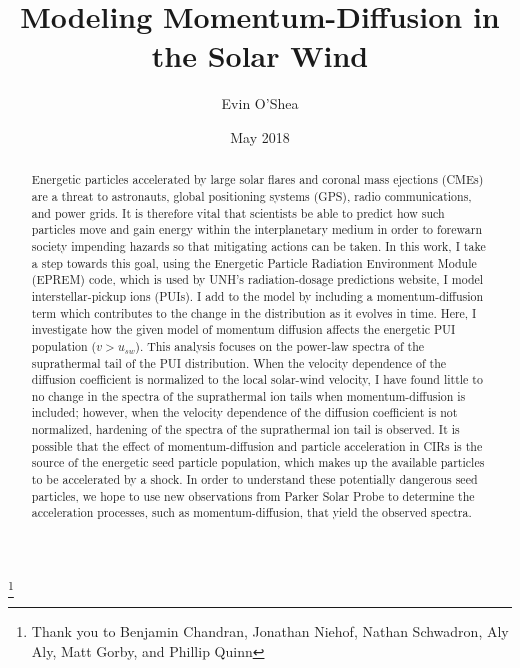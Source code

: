 \documentclass[%
 reprint,
 amsmath,amssymb,
 aps,
]{revtex4-1}
\begin{document}
\title{Modeling Momentum-Diffusion in the Solar Wind}
\thanks{Thank you to Benjamin Chandran, Jonathan Niehof, Nathan Schwadron, Aly Aly, Matt Gorby, and Phillip Quinn}

\author{Evin O'Shea}
\date{May 2018}



\begin{abstract}
Energetic particles accelerated by large solar flares and coronal mass ejections (CMEs) are a threat to astronauts, global positioning systems (GPS), radio communications, and power grids. It is therefore vital that scientists be able to predict how such particles move and gain energy within the interplanetary medium in order to forewarn society impending hazards so that mitigating actions can be taken. In this work, I take a step towards this goal, using the Energetic Particle Radiation Environment Module (EPREM) code, which is used by UNH's radiation-dosage predictions website, I model interstellar-pickup ions (PUIs). I add to the model by including a momentum-diffusion term which contributes to the change in the distribution as it evolves in time. Here, I investigate how the given model of momentum diffusion affects the energetic PUI population ($v>u_{sw}$). This analysis focuses on the power-law spectra of the suprathermal tail of the PUI distribution. When the velocity dependence of the diffusion coefficient is normalized to the local solar-wind velocity, I have found little to no change in the spectra of the suprathermal ion tails when momentum-diffusion is included; however, when the velocity dependence of the diffusion coefficient is not normalized, hardening of the spectra of the suprathermal ion tail is observed. It is possible that the effect of momentum-diffusion and particle acceleration in CIRs is the source of the energetic seed particle population, which makes up the available particles to be accelerated by a shock. In order to understand these potentially dangerous seed particles, we hope to use new observations from Parker Solar Probe to determine the acceleration processes, such as momentum-diffusion, that yield the observed spectra.

\end{abstract}



\maketitle
\end{document}
